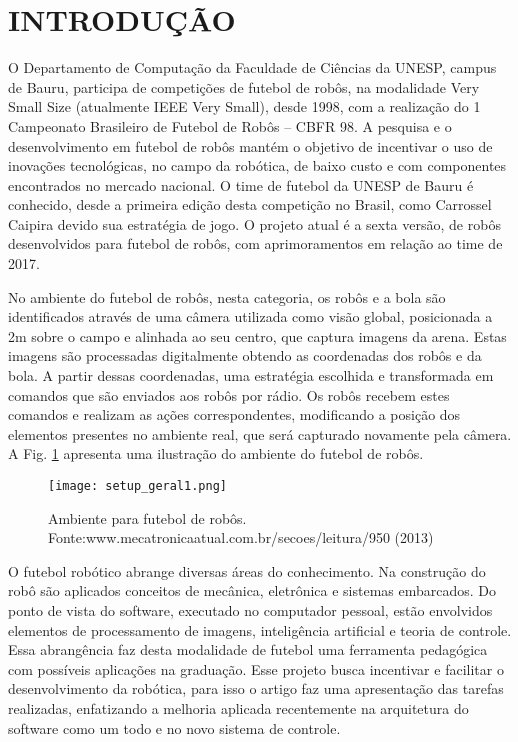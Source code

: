  \section{INTRODU{\c C}ÃO}

O Departamento de Computação da Faculdade de Ciências
da UNESP, campus de Bauru, participa de competições de
futebol de robôs, na modalidade Very Small Size (atualmente
IEEE Very Small), desde 1998, com a realização do 1\textordmasculine
Campeonato Brasileiro de Futebol de Robôs -- CBFR 98. A
pesquisa e o desenvolvimento em futebol de robôs mantém o objetivo de incentivar o uso de
inovações tecnológicas, no campo da robótica, de baixo custo e
com componentes encontrados no mercado nacional. O time de futebol da UNESP
de Bauru é conhecido, desde a primeira edição desta
competição no Brasil, como Carrossel Caipira devido sua
estratégia de jogo. O projeto atual é a sexta versão, de robôs
desenvolvidos para futebol de robôs, com aprimoramentos em
relação ao time de 2017.

No ambiente do futebol de robôs, nesta categoria, os robôs
e a bola são identificados através de uma câmera utilizada
como visão global, posicionada a 2m sobre o campo e alinhada
ao seu centro, que captura imagens da arena. Estas imagens são
processadas digitalmente obtendo as coordenadas dos robôs e da bola.
A partir dessas coordenadas, uma estratégia escolhida e transformada em comandos que são enviados aos
robôs por rádio. Os robôs recebem estes comandos e realizam
as ações correspondentes, modificando a posição dos
elementos presentes no ambiente real, que será capturado
novamente pela câmera. A Fig. \ref{fig:setup_geral} apresenta uma ilustração do
ambiente do futebol de robôs.

\begin{figure}[!htb]
    \centering
        \texttt{[image: setup\_geral1.png]}
        \caption{Ambiente para futebol de robôs. Fonte:www.mecatronicaatual.com.br/secoes/leitura/950 (2013)}
    \label{fig:setup_geral}
\end{figure}

O futebol robótico abrange diversas áreas do conhecimento.
Na construção do robô são aplicados conceitos de mecânica,
eletrônica e sistemas embarcados. Do ponto de vista do
software, executado no computador pessoal, estão envolvidos
elementos de processamento de imagens, inteligência artificial
e teoria de controle. Essa abrangência faz desta modalidade de
futebol uma ferramenta pedagógica com possíveis aplicações
na graduação.
Esse projeto busca incentivar e facilitar o desenvolvimento
da robótica, para isso o artigo faz uma apresentação das tarefas
realizadas, enfatizando a melhoria aplicada recentemente na arquitetura do software
como um todo e no novo sistema de controle.

